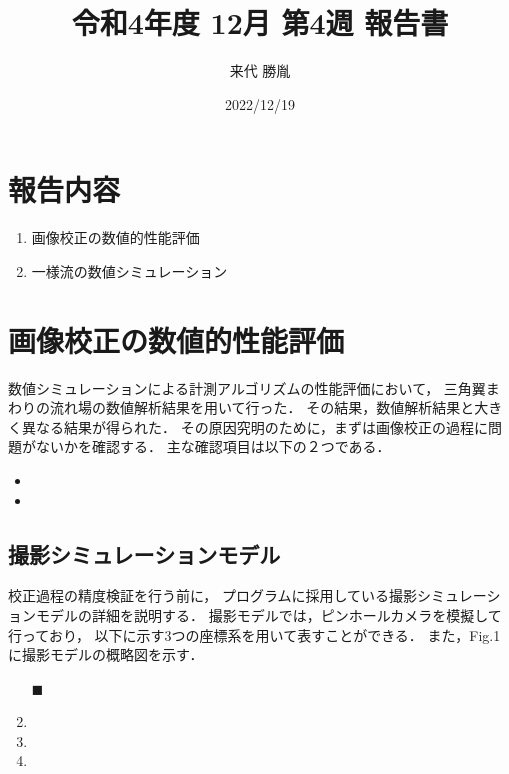 \documentclass[twocolumn,a4j]{jsarticle}
\author{来代 勝胤}
\title{令和4年度 12月 第4週 報告書}
\date{2022/12/19}
\begin{document}
\columnseprule=0.1mm
\maketitle

\section*{報告内容}
\begin{enumerate}[1.]
  \item 画像校正の数値的性能評価
  \item 一様流の数値シミュレーション
\end{enumerate}

\section{画像校正の数値的性能評価}
数値シミュレーションによる計測アルゴリズムの性能評価において，
三角翼まわりの流れ場の数値解析結果を用いて行った．
その結果，数値解析結果と大きく異なる結果が得られた．
その原因究明のために，まずは画像校正の過程に問題がないかを確認する．
主な確認項目は以下の２つである．

\begin{itemize}
  \item {}
  \item {}
\end{itemize}

\subsection{撮影シミュレーションモデル}
校正過程の精度検証を行う前に，
プログラムに採用している撮影シミュレーションモデルの詳細を説明する．
撮影モデルでは，ピンホールカメラを模擬して行っており，
以下に示す3つの座標系を用いて表すことができる．
また，Fig.1 に撮影モデルの概略図を示す．

\begin{enumerate}[(1)]
  \item [$\blacksquare$] 
  \item {}
  \item {}
  \item {}
\end{enumerate}
\end{document}
